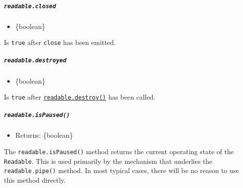\subparagraph{\texorpdfstring{\texttt{readable.closed}}{readable.closed}}\label{readable.closed}

\begin{itemize}
\tightlist
\item
  \{boolean\}
\end{itemize}

Is \texttt{true} after
\texttt{\textquotesingle{}close\textquotesingle{}} has been emitted.

\subparagraph{\texorpdfstring{\texttt{readable.destroyed}}{readable.destroyed}}\label{readable.destroyed}

\begin{itemize}
\tightlist
\item
  \{boolean\}
\end{itemize}

Is \texttt{true} after
\hyperref[readabledestroyerror]{\texttt{readable.destroy()}} has been
called.

\subparagraph{\texorpdfstring{\texttt{readable.isPaused()}}{readable.isPaused()}}\label{readable.ispaused}

\begin{itemize}
\tightlist
\item
  Returns: \{boolean\}
\end{itemize}

The \texttt{readable.isPaused()} method returns the current operating
state of the \texttt{Readable}. This is used primarily by the mechanism
that underlies the \texttt{readable.pipe()} method. In most typical
cases, there will be no reason to use this method directly.

\begin{Shaded}
\begin{Highlighting}[]
\OperatorTok{=} \NormalTok{()}\OperatorTok{;}

\NormalTok{()}\OperatorTok{;} 
\NormalTok{()}\OperatorTok{;}
\NormalTok{()}\OperatorTok{;} 
\NormalTok{()}\OperatorTok{;}
\NormalTok{()}\OperatorTok{;} 
\end{Highlighting}
\end{Shaded}

